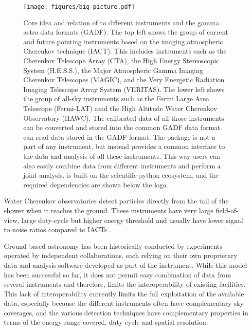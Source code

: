 \documentclass[traditabstract, longauth]{aa}
\begin{document}
\begin{figure*}[t]
	\centering
	\texttt{[image: figures/big-picture.pdf]}
	\caption{
		Core idea and relation of \gammapy to different \gammaray instruments
		and the gamma astro data formats (GADF). The top left shows the
		group of current and future pointing instruments based on the 
		imaging atmospheric Cherenkov technique (IACT). This includes
		instruments such as the  Cherenkov Telescope Array (CTA),
		the High Energy Stereoscopic System (H.E.S.S.), the
		Major Atmospheric Gamma Imaging Cherenkov Telescopes (MAGIC),
		and the Very Energetic Radiation Imaging Telescope Array System (VERITAS).
		The lower left shows the group of all-sky instruments such as the
		Fermi Large Area Telescope (Fermi-LAT) amd the High Altitude 
		Water Cherenkov Observatory (HAWC). The calibrated data of all those
		instruments can be converted and stored into the common GADF data format.
		\gammapy can read data stored in the GADF format.
		The \gammapy package is not a part of any instrument, but instead
		provides a common interface to the data and analysis of all
		these \gammaray instruments. This way users can also easily combine data from
		different instruments and perform a joint analysis.
		\gammapy is built on the scientific python ecosystem, and the required dependencies
		are shown below the \gammapy logo.
	}
	\label{fig:big_picture}

\end{figure*}

Water Cherenkov observatories detect particles directly from the tail of the
shower when it reaches the ground. These instruments have very
large field-of-view, large duty-cycle but higher energy threshold and
usually have lower signal to noise ratios compared to IACTs \citep{2015CRPhy..16..610D}.

Ground-based \gammaray astronomy has been historically conducted
by experiments operated by independent collaborations, each relying
on their own proprietary data and analysis software developed as part of the
instrument. While this model has been successful so far, it does not
permit easy combination of data from several instruments and therefore,
limits the interoperability of existing facilities. This lack of
interoperability currently limits the full exploitation of the
available \gammaray data, especially because the different instruments often have
complementary sky coverages, and the various detection
techniques have complementary properties in terms of the energy range covered,
duty cycle and spatial resolution.
\end{document}

